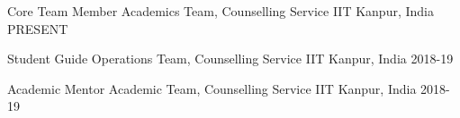 

\begin{cvhonors}

  \cvhonor
    {Core Team Member} %
    {Academics Team, Counselling Service} %
    {IIT Kanpur, India} %
    { PRESENT} %

  \cvhonor
    {Student Guide} %
    {Operations Team, Counselling Service} %
    {IIT Kanpur, India} %
    {2018-19} %

  \cvhonor
    {Academic Mentor} %
    {Academic Team, Counselling Service} %
    {IIT Kanpur, India} %
    {2018-19} %


\end{cvhonors}
